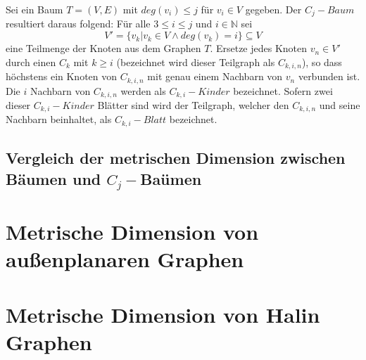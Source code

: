 \begin{defi}
Sei ein Baum $T=(V,E)$ mit $deg(v_i)\leq j$ für $v_i \in V$ gegeben. Der $C_j-Baum$ resultiert daraus folgend: 
Für alle $3 \leq i \leq j$ und $i \in \mathbb{N}$ sei $$V'=\{v_k|v_k \in V \wedge deg(v_k)=i\}\subseteq V$$ eine Teilmenge der Knoten aus dem Graphen $T$. Ersetze jedes Knoten $v_n \in V'$ durch einen $C_k$ mit $k \geq i$ (bezeichnet wird dieser Teilgraph als \emph{$C_{k,i,n}$}), so dass höchstens ein Knoten von $C_{k,i,n}$ mit genau einem Nachbarn von $v_n$ verbunden ist. Die $i$ Nachbarn von $C_{k,i,n}$ werden als \emph{$C_{k,i}-Kinder$} bezeichnet. Sofern zwei dieser $C_{k,i}-Kinder$ Blätter sind wird der Teilgraph, welcher den $C_{k,i,n}$ und seine Nachbarn beinhaltet, als \emph{$C_{k,i}-Blatt$} bezeichnet.
\end{defi}

\clearpage
\begin{satz}
\end{satz}

\subsection{Vergleich der metrischen Dimension zwischen Bäumen und $C_j-$Baümen}


\section{Metrische Dimension von außenplanaren Graphen%
}

\section{Metrische Dimension von Halin Graphen} 
